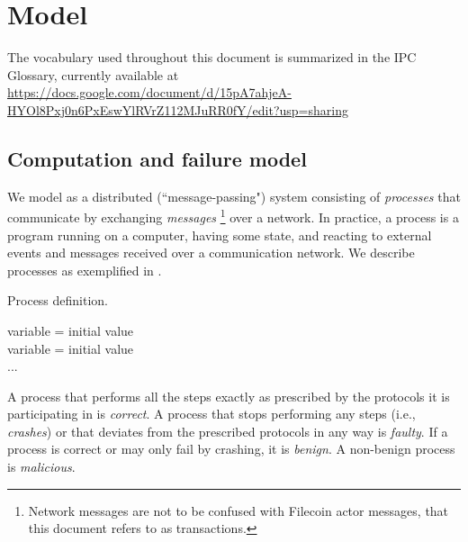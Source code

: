 \section{Model}
\label{sec:model}

The vocabulary used throughout this document is summarized in the IPC Glossary, currently available at
\href{https://docs.google.com/document/d/15pA7ahjeA-HYOl8Pxj0n6PxEswYlRVrZ112MJuRR0fY/edit?usp=sharing}{https://docs.google.com/document/d/15pA7ahjeA-HYOl8Pxj0n6PxEswYlRVrZ112MJuRR0fY/edit?usp=sharing}


\subsection{Computation and failure model}

We model \nameAbbr as a distributed (``message-passing") system consisting of \emph{processes} that communicate by exchanging \emph{messages}%
\footnote{Network messages are not to be confused with Filecoin actor messages, that this document refers to as transactions.}
over a network. 
In practice, a process is a program running on a computer, having some state, and reacting to external events and messages received over a communication network.
We describe processes as exemplified in .

\begin{algorithm}[H]
\footnotesize
\caption{Process definition.}\label{alg:process-definition}
  \DontPrintSemicolon
  variable = initial value\\
  variable = initial value\\
  ...\\
\end{algorithm}

A process that performs all the steps exactly as prescribed by the protocols it is participating in is \emph{correct}.
A process that stops performing any steps (i.e., \emph{crashes}) or that deviates from the prescribed protocols in any way is \emph{faulty}.
If a process is correct or may only fail by crashing, it is \emph{benign}.
A non-benign process is \emph{malicious}.


